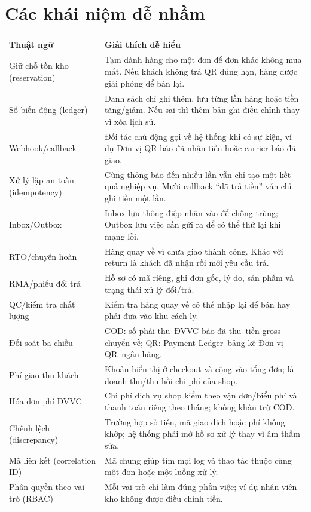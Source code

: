 \documentclass[12pt,a4paper]{report}
\begin{document}
\section{Các khái niệm dễ nhầm}
\begin{longtable}{p{}p{}}
\toprule
\textbf{Thuật ngữ} & \textbf{Giải thích dễ hiểu}\\
\midrule\endhead
Giữ chỗ tồn kho (reservation) & Tạm dành hàng cho một đơn để đơn khác không mua mất. Nếu khách không trả QR đúng hạn, hàng được giải phóng để bán lại.\\
Sổ biến động (ledger) & Danh sách chỉ ghi thêm, lưu từng lần hàng hoặc tiền tăng/giảm. Nếu sai thì thêm bản ghi điều chỉnh thay vì xóa lịch sử.\\
Webhook/callback & Đối tác chủ động gọi về hệ thống khi có sự kiện, ví dụ Đơn vị QR báo đã nhận tiền hoặc carrier báo đã giao.\\
Xử lý lặp an toàn (idempotency) & Cùng thông báo đến nhiều lần vẫn chỉ tạo một kết quả nghiệp vụ. Mười callback ``đã trả tiền'' vẫn chỉ ghi tiền một lần.\\
Inbox/Outbox & Inbox lưu thông điệp nhận vào để chống trùng; Outbox lưu việc cần gửi ra để có thể thử lại khi mạng lỗi.\\
RTO/chuyển hoàn & Hàng quay về vì chưa giao thành công. Khác với return là khách đã nhận rồi mới yêu cầu trả.\\
RMA/phiếu đổi trả & Hồ sơ có mã riêng, ghi đơn gốc, lý do, sản phẩm và trạng thái xử lý đổi/trả.\\
QC/kiểm tra chất lượng & Kiểm tra hàng quay về có thể nhập lại để bán hay phải đưa vào khu cách ly.\\
Đối soát ba chiều & COD: số phải thu--ĐVVC báo đã thu--tiền gross chuyển về; QR: Payment Ledger--bảng kê Đơn vị QR--ngân hàng.\\
Phí giao thu khách & Khoản hiển thị ở checkout và cộng vào tổng đơn; là doanh thu/thu hồi chi phí của shop.\\
Hóa đơn phí ĐVVC & Chi phí dịch vụ shop kiểm theo vận đơn/biểu phí và thanh toán riêng theo tháng; không khấu trừ COD.\\
Chênh lệch (discrepancy) & Trường hợp số tiền, mã giao dịch hoặc phí không khớp; hệ thống phải mở hồ sơ xử lý thay vì âm thầm sửa.\\
Mã liên kết (correlation ID) & Mã chung giúp tìm mọi log và thao tác thuộc cùng một đơn hoặc một luồng xử lý.\\
Phân quyền theo vai trò (RBAC) & Mỗi vai trò chỉ làm đúng phần việc; ví dụ nhân viên kho không được điều chỉnh tiền.\\
\bottomrule
\end{longtable}
\end{document}
